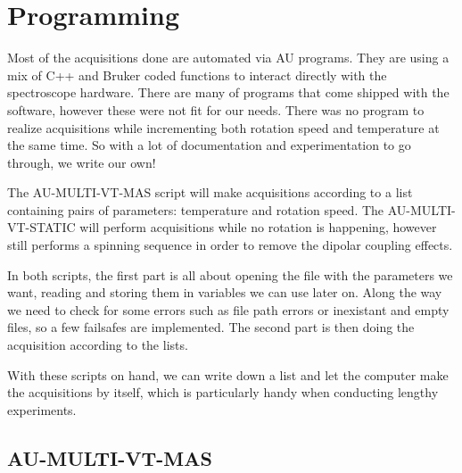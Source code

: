 \documentclass[12pt]{article}
\begin{document}
\section{Programming}

Most of the acquisitions done are automated via AU programs. They are using a mix of C++ and Bruker coded functions to interact directly with the spectroscope hardware. There are many of programs that come shipped with the software, however these were not fit for our needs. There was no program to realize acquisitions while incrementing both rotation speed and temperature at the same time. So with a lot of documentation and experimentation to go through, we write our own!

The AU-MULTI-VT-MAS script will make acquisitions according to a list containing pairs of parameters: temperature and rotation speed. The AU-MULTI-VT-STATIC will perform acquisitions while no rotation is happening, however still performs a spinning sequence in order to remove the dipolar coupling effects.

In both scripts, the first part is all about opening the file with the parameters we want, reading and storing them in variables we can use later on. Along the way we need to check for some errors such as file path errors or inexistant and empty files, so a few failsafes are implemented. The second part is then doing the acquisition according to the lists.

With these scripts on hand, we can write down a list and let the computer make the acquisitions by itself, which is particularly handy when conducting lengthy experiments.

\subsection{AU-MULTI-VT-MAS}
\end{document}
